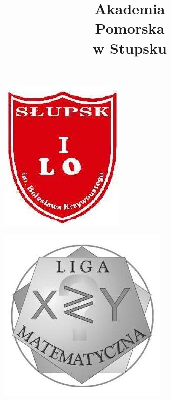 \documentclass[10pt]{article}
\title{Akademia \\
 Pomorska \\
 w Stupsku }
\author{}
\date{}
\begin{document}
\maketitle
\begin{center}
\includegraphics[max width=\textwidth]{2024_11_21_f1014f7a6d9e1d4b7ef7g-1(1)}
\end{center}

\begin{center}
\includegraphics[max width=\textwidth]{2024_11_21_f1014f7a6d9e1d4b7ef7g-1}
\end{center}
\end{document}
